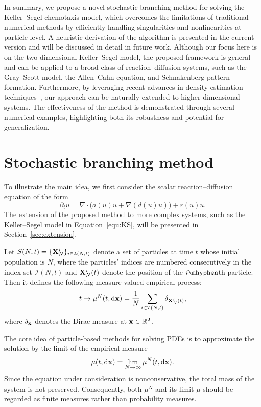 \documentclass[12pt]{article}
\begin{document}
In summary, we propose a novel stochastic branching method for solving the Keller–Segel chemotaxis model, which overcomes the limitations of traditional numerical methods by efficiently handling singularities and nonlinearities at particle level. A heuristic derivation of the algorithm is presented in the current version and will be discussed in detail in future work. Although our focus here is on the two-dimensional Keller–Segel model, the proposed framework is general and can be applied to a broad class of reaction–diffusion systems, such as the Gray–Scott model, the Allen–Cahn equation, and Schnakenberg pattern formation. Furthermore, by leveraging recent advances in density estimation techniques~\cite{novikov2021tensor, tang2025wavelet, sheng2025approximation, tang2024solving}, our approach can be naturally extended to higher-dimensional systems. The effectiveness of the method is demonstrated through several numerical examples, highlighting both its robustness and potential for generalization.



\section{Stochastic branching method}
To illustrate the main idea, we first consider the scalar reaction–diffusion equation of the form
\begin{equation}\label{equ:reaction-diffusion}
\partial_t u = \nabla \cdot \big( a(u)u + \nabla (d(u) u) \big) + r(u)u .
\end{equation}
The extension of the proposed method to more complex systems, such as the Keller–Segel model in Equation~\eqref{equ:KS}, will be presented in Section~\ref{sec:extension}.

Let $S(N,t)=\{\mathbf{X}_N^i\}_{i\in\mathcal I(N,t)}$ denote a set of particles at time $t$ whose initial population is $N$, where the particles' indices are numbered consecutively in the index set $\mathcal I(N,t)$ and $\mathbf{X}_N^i(t)$ denote the position of the $i\mhyphen$th particle. Then it defines the following measure-valued empirical process:
\begin{equation}
    t \to \mu^N(t,\mathrm{d} \mathbf{x}) =  \frac{1}{N}\sum_{i\in \mathcal I(N,t)}\delta_{\mathbf{X}_N^i(t)},
\end{equation}
where $\delta_{\mathbf{x}} $ denotes the Dirac measure at $\mathbf{x}\in \mathbb {R}^2$.

The core idea of particle-based methods for solving PDEs is to approximate the solution by the limit of the empirical measure
\[
\mu(t,\mathrm{d}\mathbf{x}) = \lim_{N\to\infty} \mu^N(t,\mathrm{d}\mathbf{x}).
\]
Since the equation under consideration is nonconservative, the total mass of the system is not preserved. Consequently, both $\mu^N$ and its limit $\mu$ should be regarded as finite measures rather than probability measures.
\end{document}
